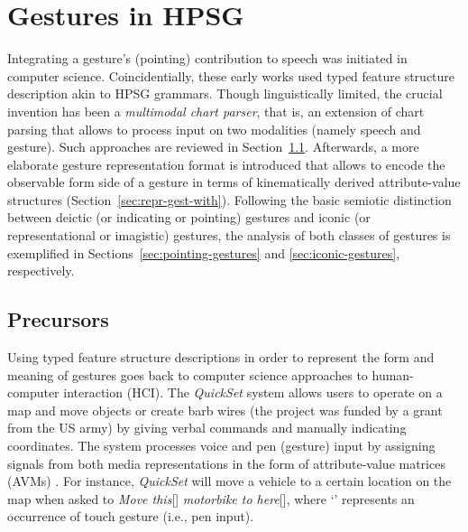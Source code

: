 \documentclass[output=paper]{langsci/langscibook}
\begin{document}
\section{Gestures in HPSG}
\label{sec:gestures-hpsg}

Integrating a gesture's (pointing) contribution to speech was initiated in computer science.
%
Coincidentially, these early works used typed feature structure description akin to HPSG grammars.
%
Though linguistically limited, the crucial invention has been a \emph{multimodal chart parser},  that is, an extension of chart parsing that allows to process input on two modalities (namely speech and gesture).
%
Such approaches are reviewed in Section~\ref{sec:precursors}.
%
Afterwards, a more elaborate gesture representation format is introduced that allows to encode the observable form side of a gesture in terms of kinematically derived attribute-value structures (Section~\ref{sec:repr-gest-with}).
%
Following the basic semiotic distinction between deictic (or indicating or pointing) gestures and iconic (or representational or imagistic) gestures, the analysis of both classes of gestures is exemplified in Sections~\ref{sec:pointing-gestures} and \ref{sec:iconic-gestures}, respectively.




\subsection{Precursors} 
\label{sec:precursors}

Using typed feature structure descriptions in order to represent the form and meaning of gestures goes back to computer science approaches to human-computer interaction (HCI). %
%
The \textit{QuickSet} system  \citep{Cohen:et:al:1997} allows users to operate on a map and move objects or create barb wires (the project was funded by a grant from the US army) by giving verbal commands and manually indicating coordinates.
%
The system processes voice and pen (gesture) input by assigning signals from both media representations in the form of attribute-value matrices (AVMs) \citep{Johnston:1998,Johnston:et:al:1997}.
%
For instance, \textit{QuickSet} will move a vehicle to a certain location on the map when asked to \emph{Move this}[\Pointing] \emph{motorbike to here}[\Pointing], where \enquote*{\Pointing} represents an occurrence of touch gesture (i.e., pen input). 
\end{document}
